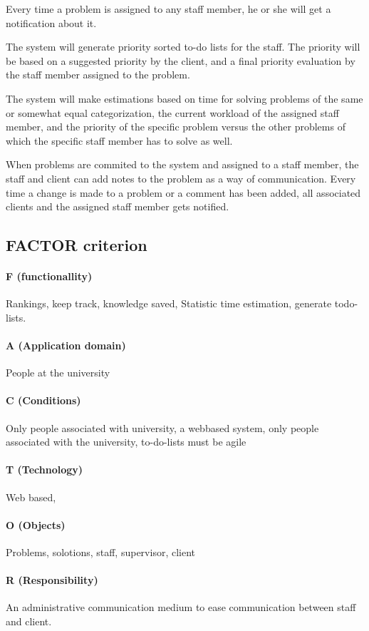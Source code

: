 Every time a problem is assigned to any staff member, he or she will get a notification about it.

The system will generate priority sorted to-do lists for the staff. The priority will be based on a suggested priority by the client, and a final priority evaluation by the staff member assigned to the problem.

The system will make estimations based on time for solving problems of the same or somewhat equal categorization, the current workload of the assigned staff member, and the priority of the specific problem versus the other problems of which the specific staff member has to solve as well.

When problems are commited to the system and assigned to a staff member, the staff and client can add notes to the problem as a way of communication. Every time a change is made to a problem or a comment has been added, all associated clients and the assigned staff member gets notified.

\subsection{FACTOR criterion}

\paragraph{F (functionallity)} Rankings, keep track, knowledge saved, Statistic time estimation, generate todo-lists.

\paragraph{A (Application domain)} People at the university

\paragraph{C (Conditions)} Only people associated with university, a webbased system, only people associated with the university, to-do-lists must be agile

\paragraph{T (Technology)} Web based, 

\paragraph{O (Objects)} Problems, solotions, staff, supervisor, client

\paragraph{R (Responsibility)} An administrative communication medium to ease communication between staff and client.\\